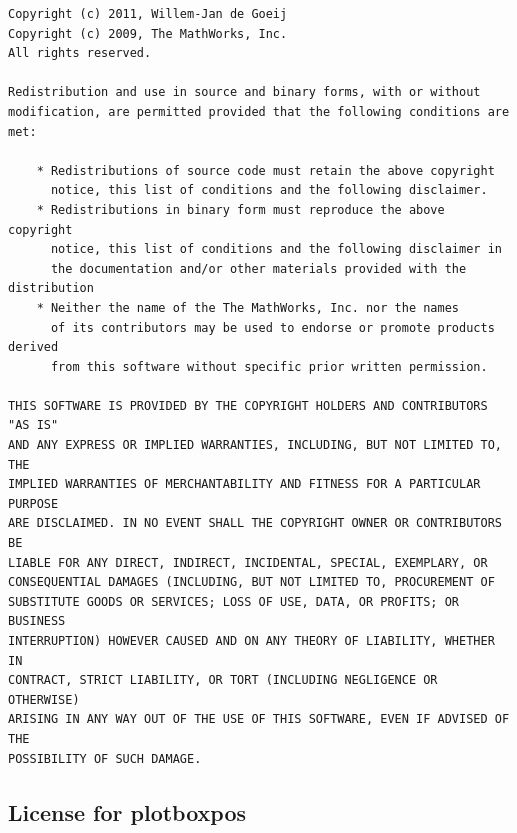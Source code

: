 \documentclass[a4paper, oneside, onecolumn, 11pt]{article}
\begin{document}
\begingroup
\footnotesize
\begin{verbatim}
Copyright (c) 2011, Willem-Jan de Goeij
Copyright (c) 2009, The MathWorks, Inc.
All rights reserved.

Redistribution and use in source and binary forms, with or without
modification, are permitted provided that the following conditions are
met:

    * Redistributions of source code must retain the above copyright
      notice, this list of conditions and the following disclaimer.
    * Redistributions in binary form must reproduce the above copyright
      notice, this list of conditions and the following disclaimer in
      the documentation and/or other materials provided with the distribution
    * Neither the name of the The MathWorks, Inc. nor the names
      of its contributors may be used to endorse or promote products derived
      from this software without specific prior written permission.

THIS SOFTWARE IS PROVIDED BY THE COPYRIGHT HOLDERS AND CONTRIBUTORS "AS IS"
AND ANY EXPRESS OR IMPLIED WARRANTIES, INCLUDING, BUT NOT LIMITED TO, THE
IMPLIED WARRANTIES OF MERCHANTABILITY AND FITNESS FOR A PARTICULAR PURPOSE
ARE DISCLAIMED. IN NO EVENT SHALL THE COPYRIGHT OWNER OR CONTRIBUTORS BE
LIABLE FOR ANY DIRECT, INDIRECT, INCIDENTAL, SPECIAL, EXEMPLARY, OR
CONSEQUENTIAL DAMAGES (INCLUDING, BUT NOT LIMITED TO, PROCUREMENT OF
SUBSTITUTE GOODS OR SERVICES; LOSS OF USE, DATA, OR PROFITS; OR BUSINESS
INTERRUPTION) HOWEVER CAUSED AND ON ANY THEORY OF LIABILITY, WHETHER IN
CONTRACT, STRICT LIABILITY, OR TORT (INCLUDING NEGLIGENCE OR OTHERWISE)
ARISING IN ANY WAY OUT OF THE USE OF THIS SOFTWARE, EVEN IF ADVISED OF THE
POSSIBILITY OF SUCH DAMAGE.
\end{verbatim}
\endgroup

\subsection{License for plotboxpos}
\end{document}
